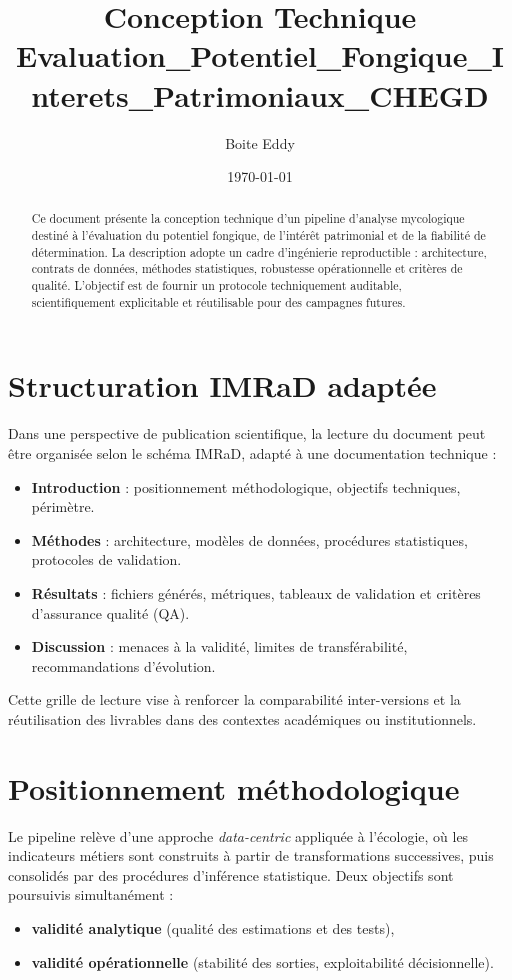 \documentclass[11pt,a4paper]{article}
\title{Conception Technique\\
\large Evaluation\_Potentiel\_Fongique\_Interets\_Patrimoniaux\_CHEGD}
\author{Boite Eddy}
\date{\today}
\begin{document}
\sloppy
\maketitle

\begin{abstract}
Ce document pr\'esente la conception technique d'un pipeline d'analyse mycologique
destin\'e à l'\'evaluation du potentiel fongique, de l'int\'erêt patrimonial et de la fiabilit\'e de d\'etermination.
La description adopte un cadre d'ing\'enierie reproductible : architecture, contrats de donn\'ees,
m\'ethodes statistiques, robustesse op\'erationnelle et critères de qualit\'e.
L'objectif est de fournir un protocole techniquement auditable, scientifiquement explicitable
et r\'eutilisable pour des campagnes futures.
\end{abstract}
\tableofcontents
\newpage

\section{Structuration IMRaD adapt\'ee}
Dans une perspective de publication scientifique, la lecture du document peut
être organis\'ee selon le sch\'ema IMRaD, adapt\'e à une documentation technique :
\begin{itemize}[leftmargin=1.2cm]
  \item \textbf{Introduction} : positionnement m\'ethodologique, objectifs techniques, p\'erimètre.
  \item \textbf{M\'ethodes} : architecture, modèles de donn\'ees, proc\'edures statistiques, protocoles de validation.
  \item \textbf{R\'esultats} : fichiers g\'en\'er\'es, m\'etriques, tableaux de validation et critères d'assurance qualit\'e (QA).
  \item \textbf{Discussion} : menaces à la validit\'e, limites de transf\'erabilit\'e, recommandations d'\'evolution.
\end{itemize}

Cette grille de lecture vise à renforcer la comparabilit\'e inter-versions et
la r\'eutilisation des livrables dans des contextes acad\'emiques ou institutionnels.

\section{Positionnement m\'ethodologique}
Le pipeline relève d'une approche \textit{data-centric} appliqu\'ee à l'\'ecologie,
où les indicateurs m\'etiers sont construits à partir de transformations successives,
puis consolid\'es par des proc\'edures d'inf\'erence statistique.
Deux objectifs sont poursuivis simultan\'ement :
\begin{itemize}[leftmargin=1.2cm]
  \item \textbf{validit\'e analytique} (qualit\'e des estimations et des tests),
  \item \textbf{validit\'e op\'erationnelle} (stabilit\'e des sorties, exploitabilit\'e d\'ecisionnelle).
\end{itemize}
\end{document}

